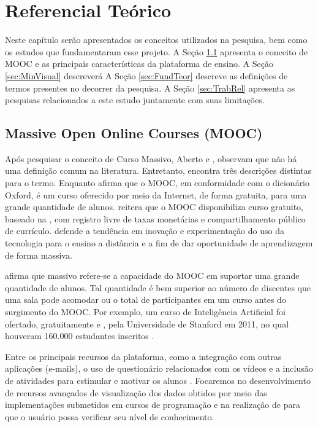 \chapter{Referencial Teórico}
\label{chap:Ref}
	Neste capítulo serão apresentados os conceitos utilizados na pesquisa, bem como
	os estudos que fundamentaram esse projeto. A Seção \ref{sec:Mooc} apresenta
	o conceito de MOOC e as principais características da plataforma de ensino.
	A Seção \ref{sec:MinVisual} descreverá  A
	Seção \ref{sec:FundTeor} descreve as definições de termos presentes no decorrer
	da pesquisa. A Seção \ref{sec:TrabRel} apresenta as pesquisas relacionados a
	este estudo juntamente com suas limitações.

	\section{Massive Open Online Courses (MOOC)}
	\label{sec:Mooc}
		Após pesquisar o conceito de Curso Massivo, Aberto e ,
		 observam que não há uma definição comum na
		literatura. Entretanto, encontra três descrições distintas para o termo.
		Enquanto  afirma que o MOOC, em conformidade com
		o dicionário Oxford, é um curso oferecido por meio da Internet, de forma
		gratuita, para uma grande quantidade de alunos. 
		reitera que o MOOC disponibiliza curso gratuito, baseado na ,
		com registro livre de taxas monetárias e compartilhamento público de
		currículo.  defende a tendência em inovação e
		experimentação do uso da tecnologia para o ensino a distância e
		 a fim de dar oportunidade de aprendizagem de forma massiva.
		
		 afirma que massivo refere-se a capacidade do MOOC em
		suportar uma grande quantidade de alunos. Tal quantidade é bem superior
		ao número de discentes que uma sala pode acomodar ou o total de
		participantes em um curso  antes do surgimento do MOOC.
		Por exemplo, um curso de Inteligência Artificial foi ofertado, gratuitamente e
		, pela Universidade de Stanford em 2011, no qual houveram
		160.000 estudantes inscritos \cite{rodriguez2012}.
		
		Entre os principais recursos da plataforma, como a integração com outras
		aplicações (e-mails), o uso de questionário relacionados com os vídeos e a
		inclusão de atividades para estimular e motivar os alunos \cite{fassbinder2014}.
		Focaremos no desenvolvimento de recursos avançados de visualização dos dados
		obtidos por meio das implementações submetidos em cursos de programação e
		na realização de  para que o usuário possa verificar seu nível
		de conhecimento.

